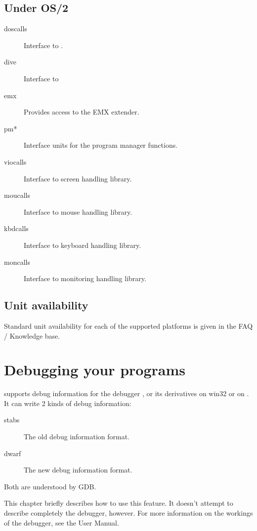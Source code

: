 \section{Under OS/2}
\begin{description}
\item[doscalls] Interface to .
\item[dive] Interface to 
\item[emx] Provides access to the EMX extender.
\item[pm*] Interface units for the program manager functions.
\item[viocalls] Interface to  screen handling library.
\item[moucalls] Interface to  mouse handling library.
\item[kbdcalls] Interface to  keyboard handling library.
\item[moncalls] Interface to  monitoring handling library.
\end{description}

\section{Unit availability}

Standard unit availability for each of the supported platforms 
is given in the FAQ / Knowledge base. 


\chapter{Debugging your programs}

\fpc supports debug information for the \gnu debugger , or
its derivatives  on win32 or  on \linux.
It can write 2 kinds of debug information:
\begin{description}
\item[stabs] The old debug information format.
\item[dwarf] The new debug information format.
\end{description}
Both are understood by GDB.

This chapter briefly describes how to use this feature. It doesn't attempt
to describe completely the \gnu debugger, however.
For more information on the workings of the \gnu debugger, see the 
User Manual.

